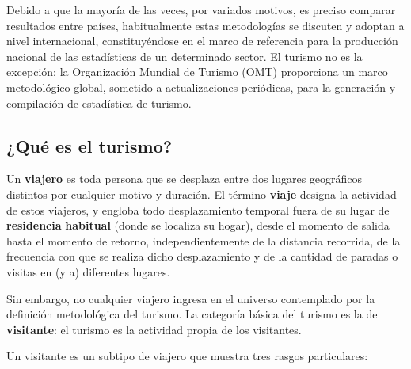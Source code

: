 \documentclass[
  openany]{book}
\begin{document}
Debido a que la mayoría de las veces, por variados motivos, es preciso comparar resultados entre países, habitualmente estas metodologías se discuten y adoptan a nivel internacional, constituyéndose en el marco de referencia para la producción nacional de las estadísticas de un determinado sector. El turismo no es la excepción: la Organización Mundial de Turismo (OMT) proporciona un marco metodológico global, sometido a actualizaciones periódicas, para la generación y compilación de estadística de turismo.

\hypertarget{quuxe9-es-el-turismo}{%
\subsection{¿Qué es el turismo?}\label{quuxe9-es-el-turismo}}

Un \textbf{viajero} es toda persona que se desplaza entre dos lugares geográficos distintos por cualquier motivo y duración. El término \textbf{viaje} designa la actividad de estos viajeros, y engloba todo desplazamiento temporal fuera de su lugar de \textbf{residencia} \textbf{habitual} (donde se localiza su hogar), desde el momento de salida hasta el momento de retorno, independientemente de la distancia recorrida, de la frecuencia con que se realiza dicho desplazamiento y de la cantidad de paradas o visitas en (y a) diferentes lugares.

Sin embargo, no cualquier viajero ingresa en el universo contemplado por la definición metodológica del turismo. La categoría básica del turismo es la de \textbf{visitante}: el turismo es la actividad propia de los visitantes.

Un visitante es un subtipo de viajero que muestra tres rasgos particulares:
\end{document}
